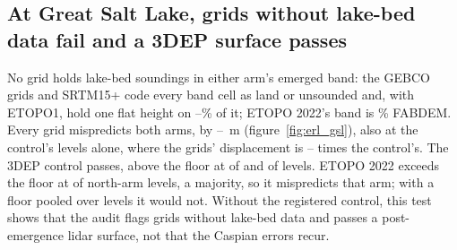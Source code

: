 \subsection{At Great Salt Lake, grids without lake-bed data fail and a 3DEP surface passes}
No grid holds lake-bed soundings in either arm's emerged band: the GEBCO grids and SRTM15+ code every band cell as land or unsounded\citep{gebco2026,tozer2019} and, with ETOPO1, hold one flat height on --\% of it; ETOPO 2022's band is \% FABDEM\citep{macferrin2025,copdem_handbook_i5}. Every grid mispredicts both arms, by --~m (figure~\ref{fig:erl_gsl}), also at the control's levels alone, where the grids' displacement is -- times the control's. The 3DEP control passes, above the floor at  of  and  of  levels. ETOPO 2022 exceeds the floor at  of  north-arm levels, a majority, so it mispredicts that arm; with a floor pooled over levels it would not. Without the registered control, this test shows that the audit flags grids without lake-bed data and passes a post-emergence lidar surface, not that the Caspian errors recur.

